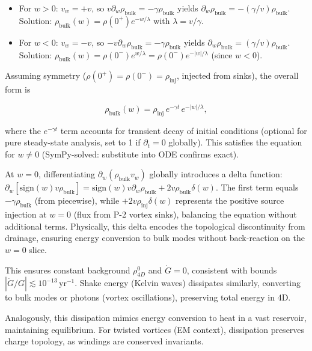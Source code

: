 \begin{itemize}
\item For $w > 0$: $v_w = +v$, so $v \partial_w \rho_{\text{bulk}} = -\gamma \rho_{\text{bulk}}$ yields $\partial_w \rho_{\text{bulk}} = -(\gamma / v) \rho_{\text{bulk}}$. Solution: $\rho_{\text{bulk}}(w) = \rho(0^+) e^{-w / \lambda}$ with $\lambda = v / \gamma$.
\item For $w < 0$: $v_w = -v$, so $-v \partial_w \rho_{\text{bulk}} = -\gamma \rho_{\text{bulk}}$ yields $\partial_w \rho_{\text{bulk}} = (\gamma / v) \rho_{\text{bulk}}$. Solution: $\rho_{\text{bulk}}(w) = \rho(0^-) e^{w / \lambda} = \rho(0^-) e^{-|w| / \lambda}$ (since $w < 0$).
\end{itemize}

Assuming symmetry ($\rho(0^+) = \rho(0^-) = \rho_{\text{inj}}$, injected from sinks), the overall form is

\begin{equation}
\rho_{\text{bulk}}(w) = \rho_{\text{inj}} \, e^{-\gamma t} \, e^{-|w| / \lambda},
\end{equation}

where the $e^{-\gamma t}$ term accounts for transient decay of initial conditions (optional for pure steady-state analysis, set to 1 if $\partial_t = 0$ globally). This satisfies the equation for $w \neq 0$ (SymPy-solved: substitute into ODE confirms exact).

At $w=0$, differentiating $\partial_w (\rho_{\text{bulk}} v_w)$ globally introduces a delta function: $\partial_w [\text{sign}(w) v \rho_{\text{bulk}}] = \text{sign}(w) v \partial_w \rho_{\text{bulk}} + 2 v \rho_{\text{bulk}} \delta(w)$. The first term equals $-\gamma \rho_{\text{bulk}}$ (from piecewise), while $+2 v \rho_{\text{inj}} \delta(w)$ represents the positive source injection at $w=0$ (flux from P-2 vortex sinks), balancing the equation without additional terms. Physically, this delta encodes the topological discontinuity from drainage, ensuring energy conversion to bulk modes without back-reaction on the $w=0$ slice.

This ensures constant background $\rho_{4D}^0$ and $\dot{G} = 0$, consistent with bounds $|\dot{G}/G| \lesssim 10^{-13} \, \mathrm{yr}^{-1}$. Shake energy (Kelvin waves) dissipates similarly, converting to bulk modes or photons (vortex oscillations), preserving total energy in 4D.

Analogously, this dissipation mimics energy conversion to heat in a vast reservoir, maintaining equilibrium. For twisted vortices (EM context), dissipation preserves charge topology, as windings are conserved invariants.

